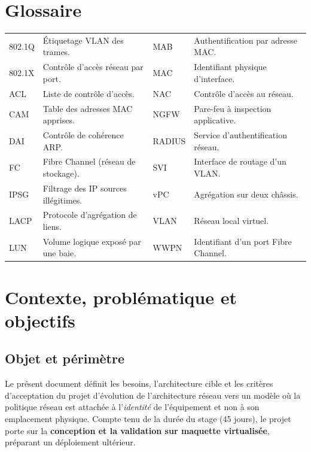 \documentclass[11pt,a4paper]{article}
\begin{document}
\section*{Glossaire}
{\small
\begin{longtable}{K L{5.8cm} K L{5.4cm}}
802.1Q & Étiquetage VLAN des trames. & MAB & Authentification par adresse MAC. \\
802.1X & Contrôle d'accès réseau par port. & MAC & Identifiant physique d'interface. \\
ACL & Liste de contrôle d'accès. & NAC & Contrôle d'accès au réseau. \\
CAM & Table des adresses MAC apprises. & NGFW & Pare-feu à inspection applicative. \\
DAI & Contrôle de cohérence ARP. & RADIUS & Service d'authentification réseau. \\
FC & Fibre Channel (réseau de stockage). & SVI & Interface de routage d'un VLAN. \\
IPSG & Filtrage des IP sources illégitimes. & vPC & Agrégation sur deux châssis. \\
LACP & Protocole d'agrégation de liens. & VLAN & Réseau local virtuel. \\
LUN & Volume logique exposé par une baie. & WWPN & Identifiant d'un port Fibre Channel. \\
\end{longtable}}

\section{Contexte, problématique et objectifs}

\subsection{Objet et périmètre}
Le présent document définit les besoins, l'architecture cible et les critères d'acceptation du projet d'évolution de l'architecture réseau vers un modèle où la politique réseau est attachée à l'\emph{identité} de l'équipement et non à son emplacement physique. Compte tenu de la durée du stage (45 jours), le projet porte sur la \textbf{conception et la validation sur maquette virtualisée}, préparant un déploiement ultérieur.
\end{document}
